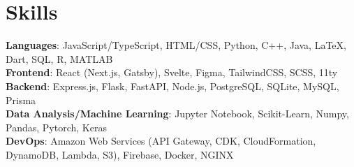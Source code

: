 \documentclass{article}
\newcommand{\resumesection}[3]{
    \subsection*{#1}
    \ 
    \ 
    \small
    \textcolor{grey}{\emph{#2}}
    \normalsize
    \hfill
    \textcolor{black}{#3}
    \normalsize
}
\begin{document}

\section*{Skills}
\textbf{Languages}: JavaScript/TypeScript, HTML/CSS, Python, C++, Java, {\selectfont\LaTeX}, Dart, SQL, R, MATLAB\\
\textbf{Frontend}: React (Next.js, Gatsby), Svelte, Figma, TailwindCSS, SCSS, 11ty\\
\textbf{Backend}: Express.js, Flask, FastAPI, Node.js, PostgreSQL, SQLite, MySQL, Prisma\\
\textbf{Data Analysis/Machine Learning}: Jupyter Notebook, Scikit-Learn, Numpy, Pandas, Pytorch, Keras\\
\textbf{DevOps}: Amazon Web Services (API Gateway, CDK, CloudFormation, DynamoDB, Lambda, S3), Firebase, Docker, NGINX\\
\end{document}
